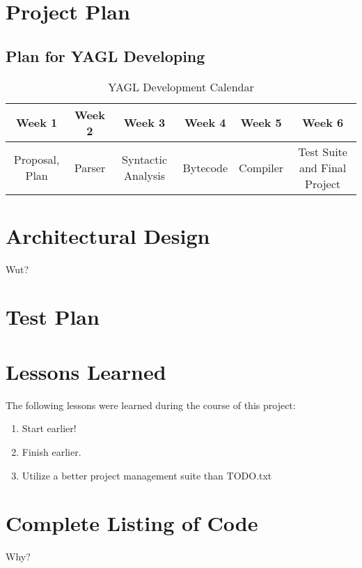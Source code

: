 \documentclass[12pt]{article}
\begin{document}
\section{Project Plan}
\subsection{Plan for YAGL Developing }
\begin{table}[H]
\caption{YAGL Development Calendar}
\centering
\begin{tabular}{c c c c c c}

\textbf{Week 1} & \textbf{Week 2} & \textbf{Week 3} & \textbf{Week 4} & \textbf{Week 5} & \textbf{Week 6}\\ [0.5ex] %
\hline
Proposal, Plan&Parser&Syntactic Analysis&Bytecode&Compiler&Test Suite and Final Project \\

\hline
\end{tabular}
\end{table}
\section{Architectural Design}
Wut?
\section{Test Plan}
\section{Lessons Learned}
The following lessons were learned during the course of this project:\\

\begin{enumerate}
  \item Start earlier!
  \item Finish earlier.
  \item Utilize a better project management suite than TODO.txt
\end{enumerate}

\section{Complete Listing of Code}
Why?
\end{document}
